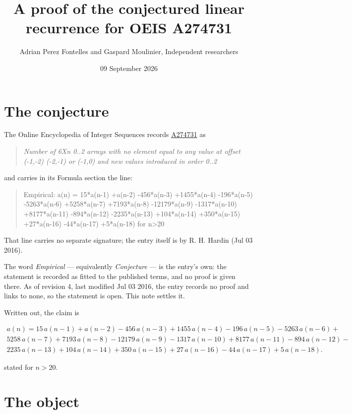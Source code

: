 \documentclass[11pt]{article}
\title{A proof of the conjectured linear recurrence for OEIS A274731}
\author{Adrian Perez Fontelles and Gaspard Moulinier, Independent researchers}
\date{09 September 2026}
\theoremstyle{definition}
\begin{document}
\maketitle
\section{The conjecture}

The Online Encyclopedia of Integer Sequences records \href{https://oeis.org/A274731}{A274731} as

\begin{quote}\itshape Number of 6Xn 0..2 arrays with no element equal to any value at offset (-1,-2) (-2,-1) or (-1,0) and new values introduced in order 0..2\end{quote}

and carries in its Formula section the line:

\begin{quote}\ttfamily Empirical: a(n) = 15*a(n-1) +a(n-2) -456*a(n-3) +1455*a(n-4) -196*a(n-5) -5263*a(n-6) +5258*a(n-7) +7193*a(n-8) -12179*a(n-9) -1317*a(n-10) +8177*a(n-11) -894*a(n-12) -2235*a(n-13) +104*a(n-14) +350*a(n-15) +27*a(n-16) -44*a(n-17) +5*a(n-18) for n>20\end{quote}

That line carries no separate signature; the entry itself is by R. H. Hardin (Jul 03 2016).

The word {\itshape Empirical} --- equivalently {\itshape Conjecture} --- is the entry's own: the statement is recorded as fitted to the published terms, and no proof is given there. As of revision 4, last modified Jul 03 2016, the entry records no proof and links to none, so the statement is open. This note settles it.

Written out, the claim is

\begin{multline*} a(n) = 15\,a(n-1) + a(n-2) - 456\,a(n-3) + 1455\,a(n-4) - 196\,a(n-5) - 5263\,a(n-6) + \\ 5258\,a(n-7) + 7193\,a(n-8) - 12179\,a(n-9) - 1317\,a(n-10) + 8177\,a(n-11) - 894\,a(n-12) - \\ 2235\,a(n-13) + 104\,a(n-14) + 350\,a(n-15) + 27\,a(n-16) - 44\,a(n-17) + 5\,a(n-18). \end{multline*}

stated for $n > 20$.

\section{The object}
\end{document}
